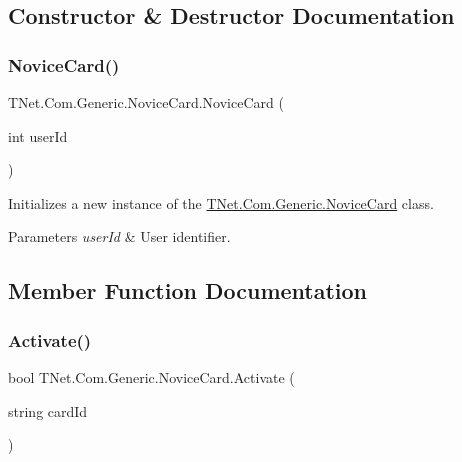 \subsection{Constructor \& Destructor Documentation}
\mbox{\label{class_t_net_1_1_com_1_1_generic_1_1_novice_card_a41541b8fc43aee68657721d8159e867a}} 
\subsubsection{\texorpdfstring{Novice\+Card()}{NoviceCard()}}
{\footnotesize\ttfamily T\+Net.\+Com.\+Generic.\+Novice\+Card.\+Novice\+Card (\begin{DoxyParamCaption}\item[{int}]{user\+Id }\end{DoxyParamCaption})\hspace{0.3cm}{\ttfamily [protected]}}



Initializes a new instance of the \mbox{\hyperlink{class_t_net_1_1_com_1_1_generic_1_1_novice_card}{T\+Net.\+Com.\+Generic.\+Novice\+Card}} class. 


\begin{DoxyParams}{Parameters}
{\em user\+Id} & User identifier.\\
\hline
\end{DoxyParams}


\subsection{Member Function Documentation}
\mbox{\label{class_t_net_1_1_com_1_1_generic_1_1_novice_card_a753787e657ffed35df4ed30aab904a71}} 
\subsubsection{\texorpdfstring{Activate()}{Activate()}}
{\footnotesize\ttfamily bool T\+Net.\+Com.\+Generic.\+Novice\+Card.\+Activate (\begin{DoxyParamCaption}\item[{string}]{card\+Id }\end{DoxyParamCaption})}



